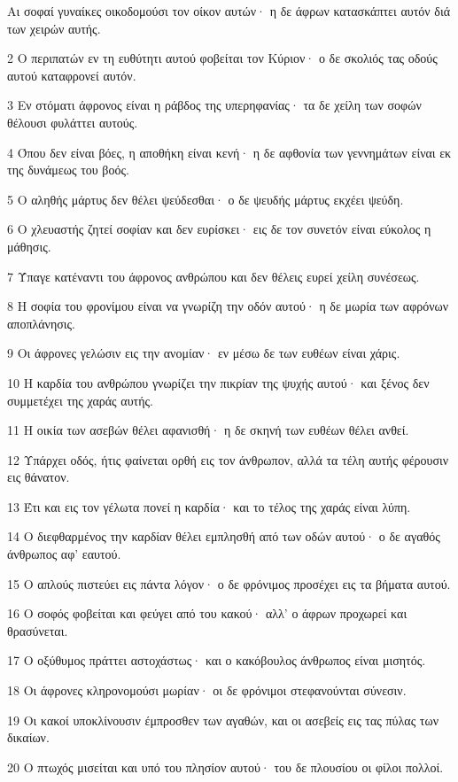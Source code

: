 \par Αι σοφαί γυναίκες οικοδομούσι τον οίκον αυτών· η δε άφρων κατασκάπτει αυτόν διά των χειρών αυτής.
\par 2 Ο περιπατών εν τη ευθύτητι αυτού φοβείται τον Κύριον· ο δε σκολιός τας οδούς αυτού καταφρονεί αυτόν.
\par 3 Εν στόματι άφρονος είναι η ράβδος της υπερηφανίας· τα δε χείλη των σοφών θέλουσι φυλάττει αυτούς.
\par 4 Όπου δεν είναι βόες, η αποθήκη είναι κενή· η δε αφθονία των γεννημάτων είναι εκ της δυνάμεως του βοός.
\par 5 Ο αληθής μάρτυς δεν θέλει ψεύδεσθαι· ο δε ψευδής μάρτυς εκχέει ψεύδη.
\par 6 Ο χλευαστής ζητεί σοφίαν και δεν ευρίσκει· εις δε τον συνετόν είναι εύκολος η μάθησις.
\par 7 Ύπαγε κατέναντι του άφρονος ανθρώπου και δεν θέλεις ευρεί χείλη συνέσεως.
\par 8 Η σοφία του φρονίμου είναι να γνωρίζη την οδόν αυτού· η δε μωρία των αφρόνων αποπλάνησις.
\par 9 Οι άφρονες γελώσιν εις την ανομίαν· εν μέσω δε των ευθέων είναι χάρις.
\par 10 Η καρδία του ανθρώπου γνωρίζει την πικρίαν της ψυχής αυτού· και ξένος δεν συμμετέχει της χαράς αυτής.
\par 11 Η οικία των ασεβών θέλει αφανισθή· η δε σκηνή των ευθέων θέλει ανθεί.
\par 12 Υπάρχει οδός, ήτις φαίνεται ορθή εις τον άνθρωπον, αλλά τα τέλη αυτής φέρουσιν εις θάνατον.
\par 13 Έτι και εις τον γέλωτα πονεί η καρδία· και το τέλος της χαράς είναι λύπη.
\par 14 Ο διεφθαρμένος την καρδίαν θέλει εμπλησθή από των οδών αυτού· ο δε αγαθός άνθρωπος αφ' εαυτού.
\par 15 Ο απλούς πιστεύει εις πάντα λόγον· ο δε φρόνιμος προσέχει εις τα βήματα αυτού.
\par 16 Ο σοφός φοβείται και φεύγει από του κακού· αλλ' ο άφρων προχωρεί και θρασύνεται.
\par 17 Ο οξύθυμος πράττει αστοχάστως· και ο κακόβουλος άνθρωπος είναι μισητός.
\par 18 Οι άφρονες κληρονομούσι μωρίαν· οι δε φρόνιμοι στεφανούνται σύνεσιν.
\par 19 Οι κακοί υποκλίνουσιν έμπροσθεν των αγαθών, και οι ασεβείς εις τας πύλας των δικαίων.
\par 20 Ο πτωχός μισείται και υπό του πλησίον αυτού· του δε πλουσίου οι φίλοι πολλοί.
